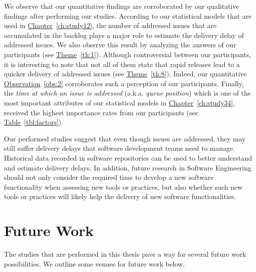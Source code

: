 We observe that our quantitative findings are corroborated by our qualitative
findings after performing our studies. According to our statistical models that
are used in \hyperref[ch:study12]{Chapter}~\ref{ch:study12}, the number of
addressed issues that are accumulated in the backlog plays a major role to
estimate the delivery delay of addressed issues. We also observe this result by
analyzing the answers of our participants (see
\hyperref[th:1]{Theme}~\ref{th:1}). Although controversial between our
participants, it is interesting to note that not all of them state that rapid
releases lead to a quicker delivery of addressed issues (see
\hyperref[th:8]{Theme}~\ref{th:8}). Indeed, our quantitative
\hyperref[obs:2]{Observation}~\ref{obs:2} corroborates such a perception of our
participants. Finally, the {\em time at which an issue is addressed} (a.k.a.
{\em queue position}) which is one of the most important attributes of our
statistical models in \hyperref[ch:study34]{Chapter}~\ref{ch:study34}, received
the highest importance rates from our participants (see
\hyperref[tbl:factors]{Table}~\ref{tbl:factors}).

Our performed studies suggest that even though issues are addressed, they may
still suffer delivery delays that software development teams need to manage.
Historical data recorded in software repositories can be used to better
understand and estimate delivery delays. In addition, future research in Software
Engineering should not only consider the required time to develop a new software
functionality when assessing new tools or practices, but also whether such new
tools or practices will likely help the delivery of new software
functionalities.  

\section{Future Work}

The studies that are performed in this thesis pave a way for several future
work possibilities. We outline some venues for future work below. 

